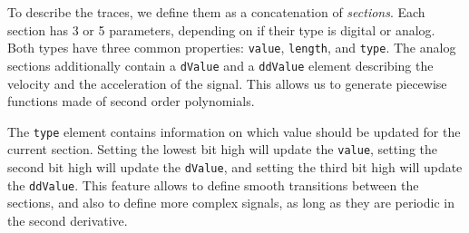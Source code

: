       To describe the traces, we define them as a concatenation of \textit{sections}. Each section has 3 or 5 parameters, depending on if their type is digital or analog. Both types have three common properties: \texttt{value}, \texttt{length}, and \texttt{type}. The analog sections additionally contain a \texttt{dValue} and a \texttt{ddValue} element describing the velocity and the acceleration of the signal. This allows us to generate piecewise functions made of second order polynomials.

      The \texttt{type} element contains information on which value should be updated for the current section. Setting the lowest bit high will update the \texttt{value}, setting the second bit high will update the \texttt{dValue}, and setting the third bit high will update the \texttt{ddValue}. This feature allows to define smooth transitions between the sections, and also to define more complex signals, as long as they are periodic in the second derivative.


